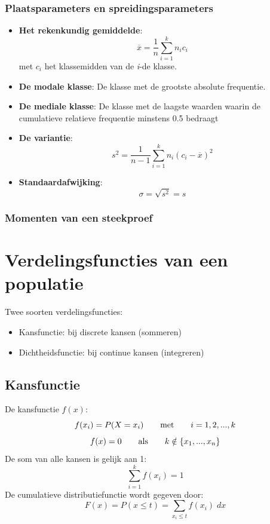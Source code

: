 \documentclass[12pt]{report}
\newcommand{\todo}[1]{
  {\color{red}\textunderscore{\textit{TODO: #1}}}
}
\begin{document}
\subsection{Plaatsparameters en spreidingsparameters}
\begin{itemize}
	\item {\textbf{Het rekenkundig gemiddelde}: 
		$$\overline{x} = \frac{1}{n}\sum_{i=1}^{k}n_ic_i$$
		met $c_i$ het klassemidden van de \textit{i}-de klasse.
	}
	\item {\textbf{De modale klasse}: De klasse met de grootste absolute frequentie.}
	\item {\textbf{De mediale klasse}: De klasse met de laagste waarden waarin de cumulatieve relatieve frequentie minstens 0.5 bedraagt}
	\item {\textbf{De variantie}:
		$$s^2 = \frac{1}{n-1}\sum_{i=1}^{k}n_i(c_i-\overline{x})^2$$
	}
	\item {\textbf{Standaardafwijking}:
		$$\sigma = \sqrt{s^2} = s$$}
\end{itemize}

\subsection{Momenten van een steekproef}
\todo{epic}

\chapter{Verdelingsfuncties van een populatie}
Twee soorten verdelingsfuncties:
\begin{itemize}
	\item Kansfunctie: bij discrete kansen (sommeren)
	\item Dichtheidsfunctie: bij continue kansen (integreren)
\end{itemize}
\section{Kansfunctie}
De kansfunctie $f(x)$:
$$f(x_i) = P(X = x_i) \qquad \hbox{met}\qquad i = 1, 2, ..., k$$
$$f(x) = 0 \qquad \hbox{als} \qquad k \notin \{x_1, ..., x_n\}$$
De som van alle kansen is gelijk aan 1:
$$\sum_{i = 1}^{k} f(x_i) = 1$$
De cumulatieve distributiefunctie wordt gegeven door:
$$F(x) = P(x \leq t) = \sum_{x_i \leq t} f(x_i)\;dx$$
\end{document}
